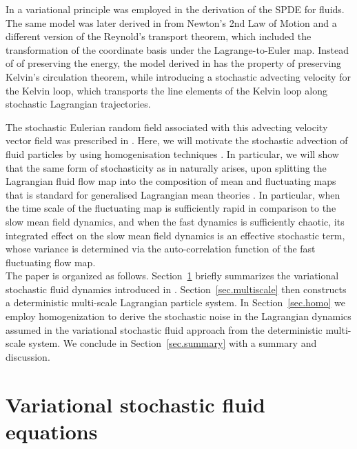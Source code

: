 \documentclass[12pt,onesided]{article}
\begin{document}
In \cite{Holm15} a variational principle was employed in the derivation of the SPDE for fluids. The same model was later derived in \cite{CrFlHo2017} from Newton's 2nd Law of Motion and a different version of the Reynold's transport theorem, which included the transformation of the coordinate basis under the Lagrange-to-Euler map. Instead of of preserving the energy, the model derived in \cite{Holm15,CrFlHo2017} has the property of preserving Kelvin's circulation theorem, while introducing a stochastic advecting velocity for the Kelvin loop, which transports the line elements of the Kelvin loop along stochastic Lagrangian trajectories. 

The stochastic Eulerian random field associated with this advecting velocity vector field was prescribed in \cite{Holm15,CrFlHo2017}. Here, we will motivate the stochastic advection of fluid particles by using homogenisation techniques \cite{PavliotisStuart}. In particular, we will show that the same form of stochasticity as in \cite{Holm15,CrFlHo2017} naturally arises, upon splitting the Lagrangian fluid flow map into the composition of mean and fluctuating maps that is standard for generalised Lagrangian mean theories \cite{andrews1978exact,buhler2014waves,holm2002lagrangian,salmon2013alternative}. In particular, when the time scale of the fluctuating map is sufficiently rapid in comparison to the slow mean field dynamics, and when the fast dynamics is sufficiently chaotic, its integrated effect on the slow mean field dynamics is an effective stochastic term, whose variance is determined via the auto-correlation function of the fast fluctuating flow map.\\

The paper is organized as follows. Section~\ref{sec.Holm} briefly summarizes the variational stochastic fluid dynamics introduced in \citet{Holm15}.
Section~\ref{sec.multiscale} then constructs a deterministic multi-scale Lagrangian particle system. In Section~\ref{sec.homo} we employ homogenization to derive the stochastic noise in the Lagrangian dynamics assumed in the variational stochastic fluid approach from the deterministic multi-scale system. We conclude in Section~\ref{sec.summary} with a summary and discussion.


\section{Variational stochastic fluid equations}
\label{sec.Holm}
\end{document}
